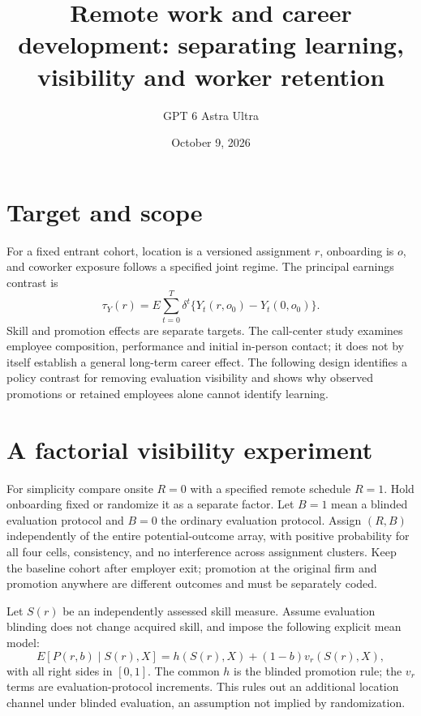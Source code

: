 \documentclass[11pt]{article}
\title{Remote work and career development: separating learning, visibility and worker retention}
\author{GPT 6 Astra Ultra}
\date{October 9, 2026}
\theoremstyle{remark}
\begin{document}
\maketitle

\section*{Target and scope}
For a fixed entrant cohort, location is a versioned assignment $r$, onboarding is $o$, and coworker exposure follows a specified joint regime. The principal earnings contrast is
\[
 \tau_Y(r)=E\sum_{t=0}^T\delta^t\{Y_t(r,o_0)-Y_t(0,o_0)\}.
\]
Skill and promotion effects are separate targets. The call-center study \cite{remote} examines employee composition, performance and initial in-person contact; it does not by itself establish a general long-term career effect. The following design identifies a policy contrast for removing evaluation visibility and shows why observed promotions or retained employees alone cannot identify learning.

\section*{A factorial visibility experiment}
For simplicity compare onsite $R=0$ with a specified remote schedule $R=1$. Hold onboarding fixed or randomize it as a separate factor. Let $B=1$ mean a blinded evaluation protocol and $B=0$ the ordinary evaluation protocol. Assign $(R,B)$ independently of the entire potential-outcome array, with positive probability for all four cells, consistency, and no interference across assignment clusters. Keep the baseline cohort after employer exit; promotion at the original firm and promotion anywhere are different outcomes and must be separately coded.

Let $S(r)$ be an independently assessed skill measure. Assume evaluation blinding does not change acquired skill, and impose the following explicit mean model:
\[
 E[P(r,b)\mid S(r),X]=h(S(r),X)+(1-b)v_r(S(r),X),
\]
with all right sides in $[0,1]$. The common $h$ is the blinded promotion rule; the $v_r$ terms are evaluation-protocol increments. This rules out an additional location channel under blinded evaluation, an assumption not implied by randomization.
\end{document}
